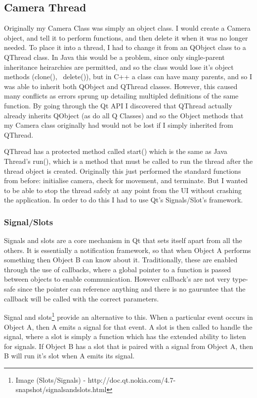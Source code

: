 \documentclass[11pt]{article} %
\begin{document}
{{\subsection{Camera Thread}
Originally my Camera Class was simply an object class. I would create a Camera object, and tell it to perform functions, and then delete it when it was no longer needed. To place it into a thread, I had to change it from an QObject class to a QThread class. In Java this would be a problem, since only single-parent inheritance heirarchies are permitted, and so the class would lose it's object methods (clone(), ~delete()), but in C++ a class can have many parents, and so I was able to inherit both QObject and QThread classes.
However, this caused many conflicts as errors sprung up detailing multipled definitions of the same function. By going through the Qt API I discovered that QThread actually already inherits QObject (as do all Q Classes) and so the Object methods that my Camera class originally had would not be lost if I simply inherited from QThread.

QThread has a protected method called start() which is the same as Java Thread's run(), which is a method that must be called to run the thread after the thread object is created. Originally this just performed the standard functions from before:  initialise camera, check for movement, and terminate. But I wanted to be able to stop the thread safely at any point from the UI without crashing the application. In order to do this I had to use Qt's Signals/Slot's framework.

\subsubsection{Signal/Slots}
Signals and slots are a core mechanism in Qt that sets itself apart from all the others. It is essentially a notification framework, so that when Object A performs something then Object B can know about it.  Traditionally, these are enabled through the use of callbacks, where a global pointer to a function is passed between objects to enable communication. However callback's are not very type-safe since the pointer can reference anything and there is no gauruntee that the callback will be called with the correct parameters.

Signal and slots\footnote{Image (Slots/Signals) - http://doc.qt.nokia.com/4.7-snapshot/signalsandslots.html} provide an alternative to this. When a particular event occurs in Object A, then A emits a signal for that event. A slot  is then called to handle the signal, where a slot is simply a function which has the extended ability to listen for signals. If Object B has a slot that is paired with a signal from Object A, then  B will run it's slot when A emits its signal.

}}
\end{document}
